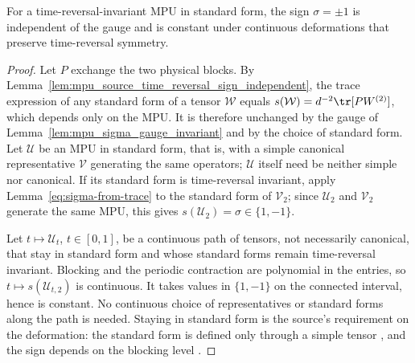 \begin{lemma}
    \label{prop:sigma-well-defined}
    \leanok
    For a time-reversal-invariant MPU in standard form, the sign
    $\sigma=\pm1$ is independent of the gauge and is constant under continuous
    deformations that preserve time-reversal symmetry.
\end{lemma}

\begin{proof}\leanok
    Let $P$ exchange the two physical blocks. By
    Lemma~\ref{lem:mpu_source_time_reversal_sign_independent}, the trace
    expression of any standard form of a tensor $\mathcal W$ equals
    $s(\mathcal W)=d^{-2}\tr[PW^{(2)}]$, which depends only on the MPU. It is
    therefore unchanged by the gauge of Lemma~\ref{lem:mpu_sigma_gauge_invariant}
    and by the choice of standard form. Let $\mathcal U$ be an MPU in standard
    form, that is, with a simple canonical representative $\mathcal V$
    generating the same operators; $\mathcal U$ itself need be neither simple
    nor canonical. If its standard form is time-reversal invariant, apply
    Lemma~\ref{eq:sigma-from-trace} to the standard form of $\mathcal V_2$; since
    $\mathcal U_2$ and $\mathcal V_2$ generate the same MPU, this gives
    $s(\mathcal U_2)=\sigma\in\{1,-1\}$.

    Let $t\mapsto\mathcal U_t$, $t\in[0,1]$, be a continuous path of tensors,
    not necessarily canonical, that stay in standard form and whose standard
    forms remain time-reversal invariant. Blocking and
    the periodic contraction are polynomial in the entries, so
    $t\mapsto s(\mathcal U_{t,2})$ is continuous. It takes values in $\{1,-1\}$
    on the connected interval, hence is constant. No continuous choice of
    representatives or standard forms along the path is needed. Staying in
    standard form is the source's requirement on the deformation: the standard
    form is defined only through a simple tensor
    \cite[lines~619--622]{Cirac2017MPU},
    and the sign depends on the blocking level
    \cite[lines~1633--1641]{Cirac2017MPU}.
\end{proof}

